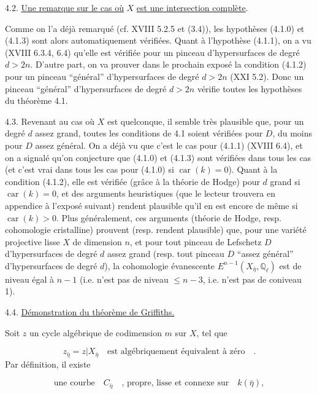 4.2. \underline{Une remarque sur le cas où} $X$ \underline{est une intersection complète}.

Comme on l'a déjà remarqué (cf. XVIII 5.2.5 et (3.4)), les hypothèses (4.1.0) et (4.1.3) sont alors automatiquement vérifiées. Quant à l'hypothèse (4.1.1), on a vu (XVIII 6.3.4, 6.4) qu'elle est vérifiée pour un pinceau d'hypersurfaces de degré $d > 2n$. D'autre part, on va prouver dans le prochain exposé la condition (4.1.2) pour un pinceau ``général'' d'hypersurfaces de degré $d > 2n$ (XXI 5.2). Donc un pinceau ``général'' d'hypersurfaces de degré $d > 2n$ vérifie toutes les hypothèses du théorème 4.1.



4.3. Revenant au cas où $X$ est quelconque, il semble très plausible que, pour un degré $d$ assez grand, toutes les conditions de 4.1 soient vérifiées pour $D$, du moins pour $D$ assez général. On a déjà vu que c'est le cas pour (4.1.1) (XVIII 6.4), et on a signalé qu'on conjecture que (4.1.0) et (4.1.3) sont vérifiées dans tous les cas (et c'est vrai dans tous les cas pour (4.1.0) si $\operatorname{car}(k)=0$). Quant à la condition (4.1.2), elle est vérifiée (grâce à la théorie de Hodge) pour $d$ grand si $\operatorname{car}(k)=0$, et des arguments heuristiques (que le lecteur trouvera en appendice à l'exposé suivant) rendent plausible qu'il en est encore de même si $\operatorname{car}(k)>0$. Plus généralement, ces arguments (théorie de Hodge, resp. cohomologie cristalline) prouvent (resp. rendent plausible) que, pour une variété projective lisse $X$ de dimension $n$, et pour tout pinceau de Lefschetz $D$ d'hypersurfaces de degré $d$ assez grand (resp. tout pinceau $D$ ``assez général'' d'hypersurfaces de degré $d$), la cohomologie évanescente $E^{n-1}(X_{\bar{\eta}}, \mathbb{Q}_{\ell})$ est de niveau égal à $n-1$ (i.e. n'est pas de niveau $\leqslant n-3$, i.e. n'est pas de coniveau 1).


4.4.  \underline{Démonstration du théorème de Griffiths.}

Soit $z$ un cycle algébrique de codimension $m$ sur $X$, tel que

\begin{equation}\tag{4.4.1}
z_{\bar{\eta}} = z|X_{\bar{\eta}} \quad \text{est algébriquement équivalent à zéro} \quad .
\end{equation}
Par définition, il existe

\begin{equation}\tag{4.4.2}
\text{une courbe} \quad C_{\bar{\eta}} \quad \text{, propre, lisse et connexe sur} \quad k(\bar{\eta}) , 
\end{equation}

